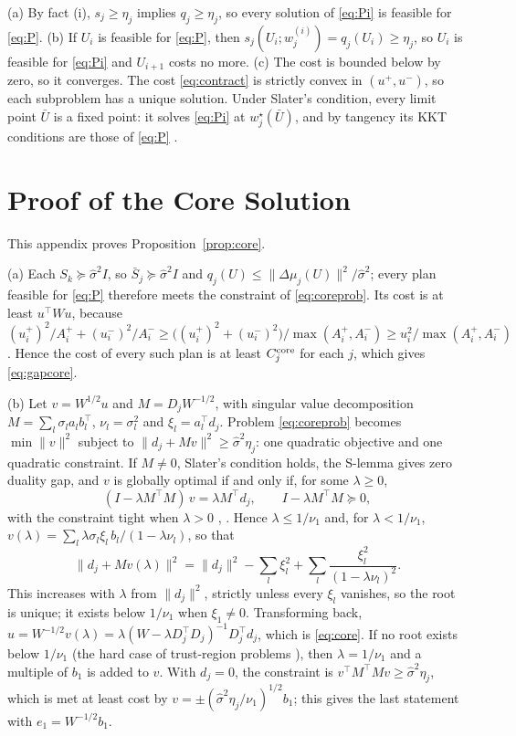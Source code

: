 \documentclass[journal,onecolumn,11pt]{IEEEtran}
\newcommand{\tp}{^{\top}}
\begin{document}
(a) By fact (i), $s_j\ge\eta_j$ implies $q_j\ge\eta_j$, so every solution of \eqref{eq:Pi} is feasible for \eqref{eq:P}. (b) If $U_i$ is feasible for \eqref{eq:P}, then $s_j(U_i;w_j^{(i)})=q_j(U_i)\ge\eta_j$, so $U_i$ is feasible for \eqref{eq:Pi} and $U_{i+1}$ costs no more. (c) The cost is bounded below by zero, so it converges. The cost \eqref{eq:contract} is strictly convex in $(u^+,u^-)$, so each subproblem has a unique solution. Under Slater's condition, every limit point $\bar U$ is a fixed point: it solves \eqref{eq:Pi} at $w_j^\star(\bar U)$, and by tangency its KKT conditions are those of \eqref{eq:P} \cite{marks1978,lipp2016}.

\section{Proof of the Core Solution}\label{app:core}
This appendix proves Proposition~\ref{prop:core}.

(a) Each $S_k\succeq\hat\sigma^2I$, so $\bar S_j\succeq\hat\sigma^2I$ and $q_j(U)\le\|\Delta\mu_j(U)\|^2/\hat\sigma^2$; every plan feasible for \eqref{eq:P} therefore meets the constraint of \eqref{eq:coreprob}. Its cost is at least $u\tp Wu$, because
$(u_i^+)^2/A_i^++(u_i^-)^2/A_i^-\ge\big((u_i^+)^2+(u_i^-)^2\big)/\max(A_i^+,A_i^-)\ge u_i^2/\max(A_i^+,A_i^-)$.
Hence the cost of every such plan is at least $C_j^{\rm core}$ for each $j$, which gives \eqref{eq:gapcore}.

(b) Let $v=W^{1/2}u$ and $M=D_jW^{-1/2}$, with singular value decomposition $M=\sum_l\sigma_la_lb_l\tp$, $\nu_l=\sigma_l^2$ and $\xi_l=a_l\tp d_j$. Problem \eqref{eq:coreprob} becomes $\min\|v\|^2$ subject to $\|d_j+Mv\|^2\ge\hat\sigma^2\eta_j$: one quadratic objective and one quadratic constraint. If $M\ne0$, Slater's condition holds, the S-lemma gives zero duality gap, and $v$ is globally optimal if and only if, for some $\lambda\ge0$,
\begin{equation}\label{eq:A3}
(I-\lambda M\tp M)\,v=\lambda M\tp d_j,\qquad I-\lambda M\tp M\succeq0,
\end{equation}
with the constraint tight when $\lambda>0$ \cite[App.~B]{boyd2004}, \cite{more1983}. Hence $\lambda\le1/\nu_1$ and, for $\lambda<1/\nu_1$, $v(\lambda)=\sum_l\lambda\sigma_l\xi_l\,b_l/(1-\lambda\nu_l)$, so that
\begin{equation}\label{eq:A4}
\|d_j+Mv(\lambda)\|^2=\|d_j\|^2-\sum_l\xi_l^2+\sum_l\frac{\xi_l^2}{(1-\lambda\nu_l)^2}.
\end{equation}
This increases with $\lambda$ from $\|d_j\|^2$, strictly unless every $\xi_l$ vanishes, so the root is unique; it exists below $1/\nu_1$ when $\xi_1\ne0$. Transforming back, $u=W^{-1/2}v(\lambda)=\lambda(W-\lambda D_j\tp D_j)^{-1}D_j\tp d_j$, which is \eqref{eq:core}. If no root exists below $1/\nu_1$ (the hard case of trust-region problems \cite{more1983}), then $\lambda=1/\nu_1$ and a multiple of $b_1$ is added to $v$. With $d_j=0$, the constraint is $v\tp M\tp Mv\ge\hat\sigma^2\eta_j$, which is met at least cost by $v=\pm(\hat\sigma^2\eta_j/\nu_1)^{1/2}b_1$; this gives the last statement with $e_1=W^{-1/2}b_1$.
\end{document}

